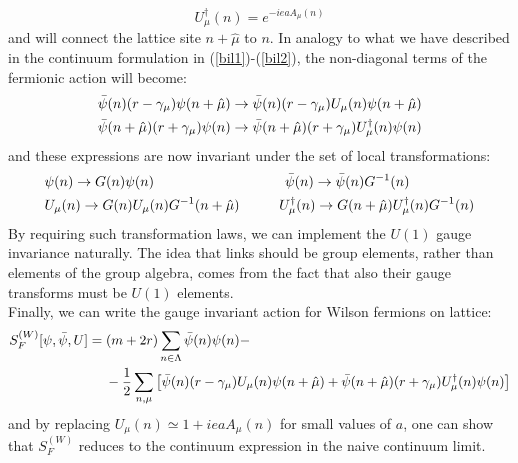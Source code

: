 \begin{equation}\label{U}
    U_\mu^\dagger(n) = e^{-ieaA_\mu(n)}
\end{equation}
and will connect the lattice site $n + \hat{\mu}$ to $n$. In analogy to what we have described in the continuum formulation in (\ref{bil1})-(\ref{bil2}), the non-diagonal terms of the fermionic action will become:
\begin{equation}
    \begin{split}
        & \Bar{\psi}(n) (r - \gamma_\mu) \psi(n + \hat{\mu}) \to \Bar{\psi}(n) (r - \gamma_\mu) U_\mu(n) \psi(n + \hat{\mu}) \\
        & \Bar{\psi}(n + \hat{\mu}) (r + \gamma_\mu) \psi(n) \to \Bar{\psi}(n + \hat{\mu}) (r + \gamma_\mu) U_\mu^\dagger(n) \psi(n)
    \end{split}
\end{equation}
and these expressions are now invariant under the set of local transformations:
\begin{equation}
    \begin{split}
        & \psi(n) \to G(n) \psi(n) \hspace{33 mm} \Bar{\psi}(n) \to \Bar{\psi}(n) G^{-1} (n) \\
        & U_\mu(n) \to G(n) U_\mu(n) G^{-1}(n + \hat{\mu}) \hspace{10 mm} U_\mu^\dagger(n) \to G(n + \hat{\mu}) U_\mu^\dagger(n) G^{-1}(n)
    \end{split}
\end{equation}
By requiring such transformation laws, we can implement the $U(1)$ gauge invariance naturally. The idea that links should be group elements, rather than elements of the group algebra, comes from the fact that also their gauge transforms must be $U(1)$ elements.
\\ Finally, we can write the gauge invariant action for Wilson fermions on lattice:
\begin{equation}
    \begin{split}
        & S_F^{(W)} [\psi, \Bar{\psi}, U] = (m + 2r) \sum_{n \in \Lambda} \Bar{\psi}(n) \psi(n) - \\
        & \hspace{25 mm} - \frac{1}{2} \sum_{n, \mu} \left[ \Bar{\psi}(n) (r - \gamma_\mu) U_\mu(n) \psi(n + \hat{\mu}) + \Bar{\psi}(n + \hat{\mu}) (r + \gamma_\mu) U_\mu^\dagger(n) \psi(n) \right]
    \end{split}
\end{equation}
and by replacing $U_\mu(n) \simeq 1 + i e a A_\mu(n)$ for small values of $a$, one can show that $S_F^{(W)}$ reduces to the continuum expression in the naive continuum limit.

